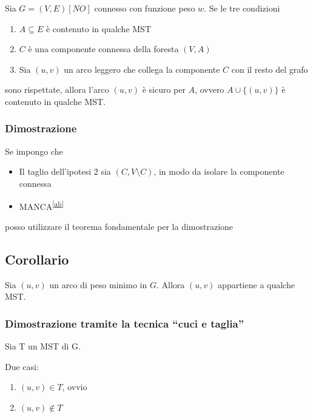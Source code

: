 \documentclass{article}
\providecommand{\tightlist}{%
  \setlength{\itemsep}{0pt}\setlength{\parskip}{0pt}}
\begin{document}
{{{Sia $G=(V,E) [NO]$ connesso con funzione peso $w$. Se le tre condizioni}

\begin{enumerate}
\tightlist
\item
  {$A \subseteq E$ è contenuto in qualche MST}
\item
  {$C$ è una componente connessa della foresta $(V,A)$}
\item
  {Sia $(u,v)$ un arco leggero che collega la componente $C$ con il resto del grafo}
\end{enumerate}

{sono rispettate, allora l'arco $(u,v)$ è sicuro per $A$, ovvero $A \cup \{(u,v)\}$ è contenuto in qualche MST.}

\subsubsection{Dimostrazione}

{Se impongo che}

\begin{itemize}
\tightlist
\item
  {Il taglio dell'ipotesi 2 sia $(C,V\setminus C)$, in modo da isolare la componente connessa}
\item
  {MANCA}\textsuperscript{\protect\hyperlink{cmnt28}{{[}ab{]}}}
\end{itemize}

{posso utilizzare il teorema fondamentale per la dimostrazione}

\subsection{Corollario}

{Sia $(u,v)$ un arco di peso minimo in $G$. Allora $(u,v)$ appartiene a qualche MST.}

\subsubsection{Dimostrazione tramite la tecnica ``cuci e taglia''}

{Sia T un MST di G. }

{Due casi:}

\begin{enumerate}
\tightlist
\item
  $(u,v)\in T${, ovvio}
\item
  $(u,v)\notin T$
\end{enumerate}

}}
\end{document}
